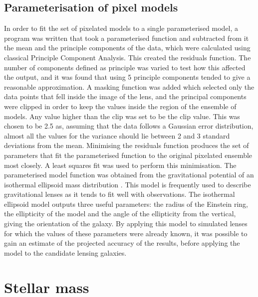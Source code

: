 \documentclass[fleqn,usenatbib]{mnras}
\begin{document}
\subsection{Parameterisation of pixel models} \label{subsec:parameter}
In order to fit the set of pixelated models to a single parameterised model, a program was written that took a parameterised function and subtracted from it the mean and the principle components of the data, which were calculated using classical Principle Component Analysis.
This created the residuals function.
The number of components defined as principle was varied to test how this affected the output, and it was found that using 5 principle components tended to give a reasonable approximation.
A masking function was added which selected only the data points that fell inside the image of the lens, and the principal components were clipped in order to keep the values inside the region of the ensemble of models.
Any value higher than the clip was set to be the clip value.
This was chosen to be 2.5 as, assuming that the data follows a Gaussian error distribution, almost all the values for the variance should lie between 2 and 3 standard deviations from the mean.
Minimising the residuals function produces the set of parameters that fit the parameterised function to the original pixelated ensemble most closely.
A least squares fit was used to perform this minimisation.
The parameterised model function was obtained from the gravitational potential of an isothermal ellipsoid mass distribution \cite{2001astro.ph..2341K}.
This model is frequently used to describe gravitational lenses as it tends to fit well with observations.
The isothermal ellipsoid model outputs three useful parameters: the radius of the Einstein ring, the ellipticity of the model and the angle of the ellipticity from the vertical, giving the orientation of the galaxy.
By applying this model to simulated lenses for which the values of these parameters were already known, it was possible to gain an estimate of the projected accuracy of the results, before applying the model to the candidate lensing galaxies.

\begin{figure}
  \caption{}
  \label{fig:parameter}
\end{figure}

\section{Stellar mass}\label{sec:stellar-mass}
\end{document}
